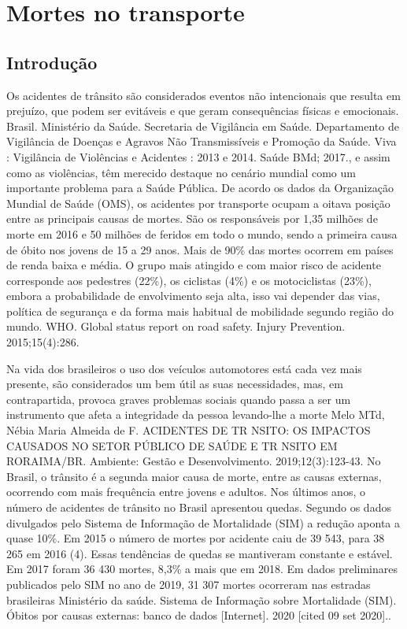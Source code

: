 
\chapter{Mortes no transporte}

\section{Introdução}

Os acidentes de trânsito são considerados eventos não intencionais que resulta em prejuízo, que podem ser evitáveis e que geram consequências físicas e emocionais. Brasil. Ministério da Saúde. Secretaria de Vigilância em Saúde. Departamento de Vigilância de Doenças e Agravos Não Transmissíveis e Promoção da Saúde. Viva : Vigilância de Violências e Acidentes : 2013 e 2014. Saúde BMd; 2017., e assim como as violências, têm merecido destaque no cenário mundial como um importante problema para a Saúde Pública. 
De acordo os dados da Organização Mundial de Saúde (OMS), os acidentes por transporte ocupam a oitava posição entre as principais causas de mortes. São os responsáveis por 1,35 milhões de morte em 2016 e 50 milhões de feridos em todo o mundo, sendo a primeira causa de óbito nos jovens de 15 a 29 anos. Mais de 90\% das mortes ocorrem em países de renda baixa e média. O grupo mais atingido e com maior risco de acidente corresponde aos pedestres (22\%), os ciclistas (4\%) e os motociclistas (23\%), embora a probabilidade de envolvimento seja alta, isso vai depender das vias, política de segurança e da forma mais habitual de mobilidade segundo região do mundo. WHO. Global status report on road safety. Injury Prevention. 2015;15(4):286.

Na vida dos brasileiros o uso dos veículos automotores está cada vez mais presente, são considerados um bem útil as suas necessidades, mas, em contrapartida, provoca graves problemas sociais quando passa a ser um instrumento que afeta a integridade da pessoa levando-lhe a morte Melo MTd, Nébia Maria Almeida de F. ACIDENTES DE TR NSITO: OS IMPACTOS CAUSADOS NO SETOR PÚBLICO DE SAÚDE E TR NSITO EM RORAIMA/BR. Ambiente: Gestão e Desenvolvimento. 2019;12(3):123-43. 
No Brasil, o trânsito é a segunda maior causa de morte, entre as causas externas, ocorrendo com mais frequência entre jovens e adultos. Nos últimos anos, o número de acidentes de trânsito no Brasil apresentou quedas. Segundo os dados divulgados pelo Sistema de Informação de Mortalidade (SIM) a redução aponta a quase 10\%. Em 2015 o número de mortes por acidente caiu de 39 543, para 38 265 em 2016 (4). Essas tendências de quedas se mantiveram constante e estável. Em 2017 foram 36 430 mortes, 8,3\% a mais que em 2018. Em dados preliminares publicados pelo SIM no ano de 2019, 31 307 mortes ocorreram nas estradas brasileiras Ministério da saúde. Sistema de Informação sobre Mortalidade (SIM). Óbitos por causas externas: banco de dados [Internet]. 2020 [cited 09 set 2020]..

